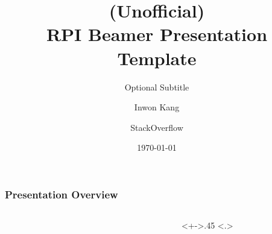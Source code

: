 \documentclass[
	10pt, %
	aspectratio=169, %
]{beamer}
\title[A Short Title for Your Slides]{(Unofficial)\\RPI Beamer Presentation Template}
\subtitle{Optional Subtitle} %
\author[]{Inwon Kang \and StackOverflow} %
\institute[RPI]{Department of Computer Science}
\date[\today]{\today}
\begin{document}
\begin{frame}[plain]
	\titlepage %
\end{frame}



\begin{frame}[noframenumbering]
	\frametitle{Presentation Overview} %

	\begin{columns}[t]
		\begin{column}{.05\textwidth}
		\end{column}
		\begin{column}{.45\textwidth}
			\tableofcontents[
				pausesections,
				sections={-3}
			]
		\end{column}
		\begin{column}<+->{.45\textwidth}
			\only<.>{\setcounter{tocseccounter}{\slideinframe}}
			\advanceslidecounter{-\thetocseccounter}
			\tableofcontents[
				pausesections,
				sections={4-}
			]
		\end{column}
	\end{columns}

\end{frame}
\end{document}
